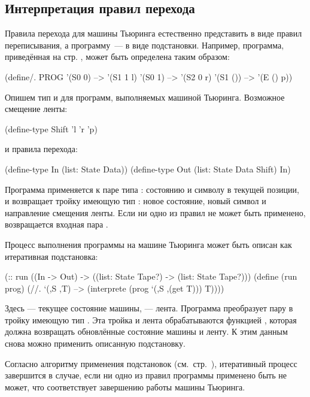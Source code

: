 \subsection*{Интерпретация правил перехода}

Правила перехода для машины Тьюринга естественно представить в виде правил переписывания, а программу~--- в виде подстановки. Например, программа, приведённая на стр. \pageref{TM-prog}, может быть определена таким образом:
\begin{SchemeCode}
(define/. PROG
  '(S0 0) --> '(S1 1 l)
  '(S0 1) --> '(S2 0 r)
  '(S1 ()) --> '(E () p))
\end{SchemeCode}

Опишем тип и для программ, выполняемых машиной Тьюринга. Возможное смещение ленты:
\begin{SchemeCode}
(define-type Shift 'l 'r 'p)
\end{SchemeCode}
\noindent и правила перехода:
\begin{SchemeCode}
(define-type In (list: State Data))
(define-type Out (list: State Data Shift) 
                 In)
\end{SchemeCode}
Программа применяется к паре типа : состоянию и символу в текущей позиции, и возвращает тройку имеющую тип : новое состояние, новый символ и направление смещения ленты. Если ни одно из правил не может быть применено, возвращается входная пара .

Процесс выполнения программы на машине Тьюринга может быть описан как итеративная подстановка:
\begin{Definition}[emph={S,T,prog}]
(:: run ((In -> Out) -> ((list: State Tape?) -> 
                         (list: State Tape?)))
  (define (run prog)
    (//. `(,S ,T) --> (interprete (prog `(,S ,(get T))) T))))
\end{Definition}

\newpage
Здесь  --- текущее состояние машины,  --- лента. Программа  преобразует пару  в тройку имеющую тип . Эта тройка и лента обрабатываются функцией , которая должна  возвращать обновлённые состояние машины и ленту. К этим данным снова можно применить описанную подстановку. 

Согласно алгоритму применения подстановок (см.~стр.~\pageref{rewriting-semantics}), итеративный процесс завершится в случае, если ни одно из правил программы применено быть не может, что соответствует завершению работы машины Тьюринга.

